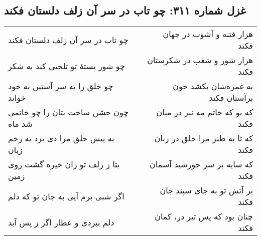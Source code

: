 \begin{center}
\section*{غزل شماره ۳۱۱: چو تاب در سر آن زلف دلستان فکند}
\label{sec:311}
\begin{longtable}{l p{0.5cm} r}
چو تاب در سر آن زلف دلستان فکند
&&
هزار فتنه و آشوب در جهان فکند
\\
چو شور پستهٔ تو تلخیی کند به شکر
&&
هزار شور و شغب در شکرستان فکند
\\
چو خلق را به سر آستین به خود خواند
&&
به غمزه‌شان بکشد خون برآستان فکند
\\
چون جشن ساخت بتان را چو خاتمی شد ماه
&&
که بو که خاتم مه نیز در میان فکند
\\
به پیش خلق مرا دی بزد به زخم زبان
&&
که تا به طنز مرا خلق در زبان فکند
\\
بتا ز زلف تو زان خیره گشت روی زمین
&&
که سایه بر سر خورشید آسمان فکند
\\
اگر شبی برم آیی به جان تو که دلم
&&
بر آتش تو به جای سپند جان فکند
\\
دلم ببردی و عطار اگر ز پس آید
&&
چنان بود که پس تیر در، کمان فکند
\\
\end{longtable}
\end{center}
